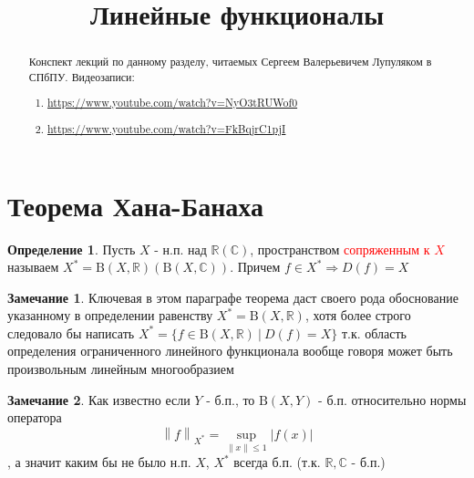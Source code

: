 \documentclass[12pt,a4paper]{article}
\title{Линейные функционалы}
\date{}
\theoremstyle{definition}
\newtheorem{definition}{Определение}[section]
\newtheorem{corollarydf}{Замечание}[definition]
\newcommand{\Real}{\mathbb{R}}
\newcommand{\Cmplx}{\mathbb{C}}
\newcommand{\norm}[1]{\left\lVert#1\right\rVert}
\newcommand{\setbuild}[2]{\{#1\:|\:#2\}}
\newcommand{\bounded}[2]{\textrm{B}(#1, #2)}
\begin{document}
\maketitle

\begin{abstract}
	Конспект лекций по данному разделу, читаемых Сергеем Валерьевичем Лупуляком в СПбПУ. Видеозаписи:
	\begin{enumerate}
		\item \url{https://www.youtube.com/watch?v=NyO3tRUWof0}
		\item \url{https://www.youtube.com/watch?v=FkBqjrC1pjI}
	\end{enumerate}
	
\end{abstract}

\newpage
\section{Теорема Хана-Банаха}

\begin{definition}
	Пусть $X$ - н.п. над $\Real(\Cmplx)$, пространством \textcolor{red}{сопряженным к $X$} называем $X^*=\bounded{X}{\Real}(\bounded{X}{\Cmplx})$. Причем $f\in X^*\Rightarrow D(f)=X$
\end{definition}

\begin{corollarydf}
	Ключевая в этом параграфе теорема даст своего рода обоснование указанному в определении равенству $X^*=\bounded{X}{\Real}$, хотя более строго следовало бы написать $X^*=\setbuild{f\in \bounded{X}{\Real}}{D(f)=X}$ т.к. область определения ограниченного линейного функционала вообще говоря может быть произвольным линейным многообразием
\end{corollarydf}

\begin{corollarydf}
	Как известно если $Y$ - б.п., то $\bounded{X}{Y}$ - б.п. относительно нормы оператора $$\norm{f}_{X^*}=\sup_{\norm{x}\leq1}|f(x)|$$, а значит каким бы не было н.п. $X$, $X^*$ всегда б.п. (т.к. $\Real,\Cmplx$ - б.п.)
\end{corollarydf}
\end{document}
